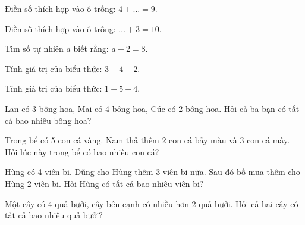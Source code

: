 \begin{ex}
Điền số thích hợp vào ô trống: $4 + \dots = 9$.
\end{ex}

\begin{ex}
Điền số thích hợp vào ô trống: $\dots + 3 = 10$.
\end{ex}

\begin{ex}
Tìm số tự nhiên $a$ biết rằng: $a + 2 = 8$.
\end{ex}

\begin{ex}
Tính giá trị của biểu thức: $3 + 4 + 2$.
\end{ex}

\begin{ex}
Tính giá trị của biểu thức: $1 + 5 + 4$.
\end{ex}

\begin{ex}
Lan có 3 bông hoa, Mai có 4 bông hoa, Cúc có 2 bông hoa. Hỏi cả ba bạn có tất cả bao nhiêu bông hoa?
\end{ex}

\begin{ex}
Trong bể có 5 con cá vàng. Nam thả thêm 2 con cá bảy màu và 3 con cá mây. Hỏi lúc này trong bể có bao nhiêu con cá?
\end{ex}

\begin{ex}
Hùng có 4 viên bi. Dũng cho Hùng thêm 3 viên bi nữa. Sau đó bố mua thêm cho Hùng 2 viên bi. Hỏi Hùng có tất cả bao nhiêu viên bi?
\end{ex}

\begin{ex}
Một cây có 4 quả bưởi, cây bên cạnh có nhiều hơn 2 quả bưởi. Hỏi cả hai cây có tất cả bao nhiêu quả bưởi?
\end{ex}

